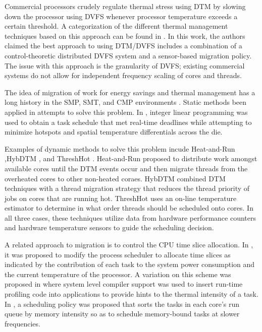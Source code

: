 \documentclass[]{sig-alternate-hotpower09}
\begin{document}
Commercial processors crudely regulate thermal stress using DTM by
slowing down the processor using DVFS whenever processor temperature
exceeds a certain threshold.  A categorization of the different thermal
management techniques based on this approach can be found in
\cite{Donald2006}.  In this work, the authors claimed the best approach
to using DTM/DVFS includes a combination of a control-theoretic
distributed DVFS system and a sensor-based migration policy.  The issue
with this approach is the granularity of DVFS; existing commercial
systems do not allow for independent frequency scaling of cores and
threads.

The idea of migration of work for energy savings and thermal management
has a long history in the SMP, SMT, and CMP environments
\cite{Yao1995}. Static methods been applied in attempts to solve this
problem.  In \cite{Coskun2008}, integer linear programming was used to
obtain a task schedule that met real-time deadlines while attempting to
minimize hotspots and spatial temperature differentials across the die.

Examples of dynamic methods to solve this problem incude Heat-and-Run
\cite{Gomaa2004},HybDTM \cite{Kumar2006}, and ThreshHot \cite{Yang2008}.
Heat-and-Run proposed to distribute work amongst available cores until
the DTM events occur and then migrate threads from the overheated cores
to other non-heated coraes. HybDTM combined DTM techniques with a thread
migration strategy that reduces the thread priority of jobs on cores
that are running hot. ThreshHot uses an on-line temperature estimator to
determine in what order threads should be scheduled onto cores. In all
three cases, these techniques utilize data from hardware performance
counters and hardware temperature sensors to guide the scheduling
decision.

A related approach to migration is to control the CPU time slice
allocation.  In \cite{Bellosa2003}, it was proposed to modify the
process scheduler to allocate time slices as indicated by the
contribution of each task to the system power consumption and the
current temperature of the processor. A variation on this scheme was
proposed in \cite{Li2008} where system level compiler support was used
to insert run-time profiling code into applications to provide hints to
the thermal intensity of a task. In \cite{Merkel2008}, a scheduling
policy was proposed that sorts the tasks in each core's run queue by
memory intensity so as to schedule memory-bound tasks at slower
frequencies.
\end{document}
